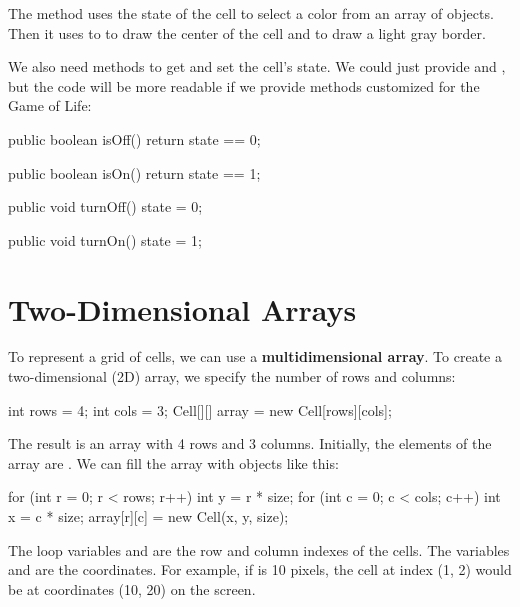The  method uses the state of the cell to select a color from an array of  objects.
Then it uses to  to draw the center of the cell and  to draw a light gray border.

We also need methods to get and set the cell's state.
We could just provide  and , but the code will be more readable if we provide methods customized for the Game of Life:

\begin{code}
public boolean isOff() {
    return state == 0;
}

public boolean isOn() {
    return state == 1;
}

public void turnOff() {
    state = 0;
}

public void turnOn() {
    state = 1;
}
\end{code}



\section{Two-Dimensional Arrays}


To represent a grid of cells, we can use a {\bf multidimensional array}.
To create a two-dimensional (2D) array, we specify the number of rows and columns:

\begin{code}
int rows = 4;
int cols = 3;
Cell[][] array = new Cell[rows][cols];
\end{code}

The result is an array with 4 rows and 3 columns.
Initially, the elements of the array are .
We can fill the array with  objects like this:

\begin{code}
for (int r = 0; r < rows; r++) {
    int y = r * size;
    for (int c = 0; c < cols; c++) {
        int x = c * size;
        array[r][c] = new Cell(x, y, size);
    }
}
\end{code}

The loop variables  and  are the row and column indexes of the cells.
The variables  and  are the coordinates.
For example, if  is 10 pixels, the cell at index (1, 2) would be at coordinates (10, 20) on the screen.

